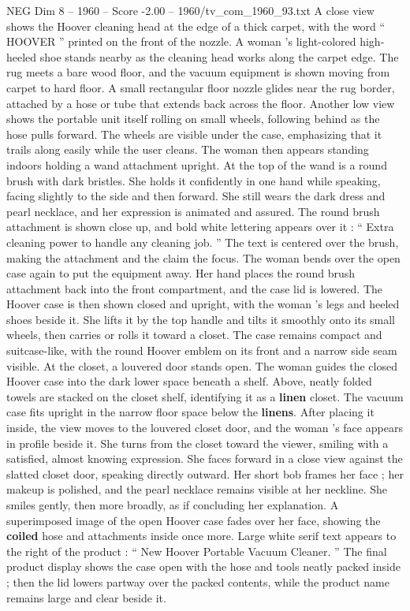 \begin{textsample}{NEG Dim 8 – 1960 – Score -2.00 – 1960/tv\_com\_1960\_93.txt}
A close view shows the Hoover cleaning head at the edge of a thick carpet, with the word “ HOOVER ” printed on the front of the nozzle.
A woman ’s light-colored high-heeled shoe stands nearby as the cleaning head works along the carpet edge.
The rug meets a bare wood floor, and the vacuum equipment is shown moving from carpet to hard floor.
A small rectangular floor nozzle glides near the rug border, attached by a hose or tube that extends back across the floor.
Another low view shows the portable unit itself rolling on small wheels, following behind as the hose pulls forward.
The wheels are visible under the case, emphasizing that it trails along easily while the user cleans.
The woman then appears standing indoors holding a wand attachment upright.
At the top of the wand is a round brush with dark bristles.
She holds it confidently in one hand while speaking, facing slightly to the side and then forward.
She still wears the dark dress and pearl necklace, and her expression is animated and assured.
The round brush attachment is shown close up, and bold white lettering appears over it : “ Extra cleaning power to handle any cleaning job. ” The text is centered over the brush, making the attachment and the claim the focus.
The woman bends over the open case again to put the equipment away.
Her hand places the round brush attachment back into the front compartment, and the case lid is lowered.
The Hoover case is then shown closed and upright, with the woman ’s legs and heeled shoes beside it.
She lifts it by the top handle and tilts it smoothly onto its small wheels, then carries or rolls it toward a closet.
The case remains compact and suitcase-like, with the round Hoover emblem on its front and a narrow side seam visible.
At the closet, a louvered door stands open.
The woman guides the closed Hoover case into the dark lower space beneath a shelf.
Above, neatly folded towels are stacked on the closet shelf, identifying it as a \textbf{linen} closet.
The vacuum case fits upright in the narrow floor space below the \textbf{linens}.
After placing it inside, the view moves to the louvered closet door, and the woman ’s face appears in profile beside it.
She turns from the closet toward the viewer, smiling with a satisfied, almost knowing expression.
She faces forward in a close view against the slatted closet door, speaking directly outward.
Her short bob frames her face ; her makeup is polished, and the pearl necklace remains visible at her neckline.
She smiles gently, then more broadly, as if concluding her explanation.
A superimposed image of the open Hoover case fades over her face, showing the \textbf{coiled} hose and attachments inside once more.
Large white serif text appears to the right of the product : “ New Hoover Portable Vacuum Cleaner. ” The final product display shows the case open with the hose and tools neatly packed inside ; then the lid lowers partway over the packed contents, while the product name remains large and clear beside it.

\end{textsample}
